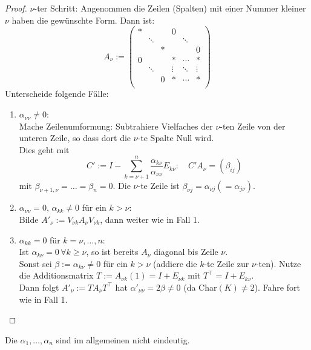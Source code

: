 \documentclass[parskip,a4paper,twoside,DIV15,BCOR12mm]{scrbook}
\begin{document}
\begin{proof}
\(\nu\)-ter Schritt: Angenommen die Zeilen (Spalten) mit einer Nummer kleiner
\(\nu\) haben die gewünschte Form. Dann ist:
\[
A_{\nu}:=
    \begin{pmatrix}
    *& & &0& & \\
     &\ddots& & &\ddots& \\
     & &*& & &0\\
    0& & &*&\cdots&* \\
     &\ddots& &\vdots&\ddots&\vdots\\
     & &0&*&\cdots&*\\
    \end{pmatrix}
\]
Unterscheide folgende Fälle:
\begin{enumerate}
\item \(\alpha_{\nu\nu}\neq 0\):\\
Mache Zeilenumformung: Subtrahiere Vielfaches
der \(\nu\)-ten Zeile von der unteren Zeile, so dass dort die \(\nu\)-te 
Spalte Null wird.\\
Dies geht mit
\[
C':=I-\sum_{k=\nu+1}^{n}{\frac{\alpha_{k\nu}}{\alpha_{\nu\nu}}E_{k\nu}}:\quad
C'A_{\nu}=(\beta_{ij})
\]
mit \(\beta_{\nu+1,\nu}=\ldots =\beta_{n}=0\). Die \(\nu\)-te Zeile ist 
\(\beta_{\nu j}=\alpha_{\nu j}\left(=\alpha_{j\nu}\right)\).
\item \(\alpha_{\nu\nu}=0,\,\alpha_{kk}\neq 0\) für ein \(k>\nu\):\\
Bilde \(A'_{\nu}:=V_{\nu k}A_{\nu}V_{\nu k}\), dann weiter wie in Fall 1.
\item \(\alpha_{kk}=0\) für \(k=\nu,\ldots,n\):\\
Ist \(\alpha_{k\nu}=0\,\forall k\geq\nu\), so ist bereits \(A_{\nu}\) diagonal
bis Zeile \(\nu\).\\
Sonst sei \(\beta:=\alpha_{k\nu}\neq0\) für ein \(k>\nu\)
(addiere die \(k\)-te Zeile zur \(\nu\)-ten).
Nutze die Additionsmatrix \(T:=A_{\nu k}(1)=I+E_{\nu k}\) mit
\(T^{\top}=I+E_{k\nu}\).\\
Dann folgt \(A'_{\nu}:=TA_{\nu}T^{\top}\) hat \(\alpha'_{\nu\nu}=2\beta\neq0\)
(da Char\((K)\neq2\)). Fahre fort wie in Fall 1.
\end{enumerate}
\end{proof}

\begin{caution} 
Die \(\alpha_{1},\ldots,\alpha_{n}\) sind im allgemeinen nicht eindeutig.
\end{caution}
\end{document}
